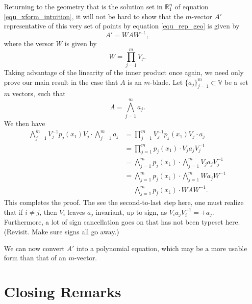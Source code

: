 \documentclass{ecgd-l}
\theoremstyle{definition}
\theoremstyle{remark}
\numberwithin{equation}{section}
\newcommand{\V}{\mathbb{V}}
\newcommand{\R}{\mathbb{R}}
\begin{document}
Returning to the geometry that is the solution set in $\R_1^n$
of equation \eqref{equ_xform_intuition},
it will not be hard to show that the $m$-vector $A'$ representative
of this very set of points by equation \eqref{equ_rep_geo} is given by
\begin{equation*}
A' = WAW^{-1},
\end{equation*}
where the versor $W$ is given by
\begin{equation*}
W = \prod_{j=1}^m V_j.
\end{equation*}
Taking advantage of the linearity of the inner product once again,
we need only prove our main result in the case that $A$ is an $m$-blade.
Let $\{a_j\}_{j=1}^m\subset \V$ be a set $m$ vectors, such that
\begin{equation*}
A = \bigwedge_{j=1}^m a_j.
\end{equation*}
We then have
\begin{align}
\bigwedge_{j=1}^m V_j^{-1}p_j(x_1)V_j\cdot\bigwedge_{j=1}^m a_j &=
\prod_{j=1}^m V_j^{-1}p_j(x_1)V_j\cdot a_j\nonumber \\
 &= \prod_{j=1}^m p_j(x_1)\cdot V_ja_jV_j^{-1}\nonumber \\
&= \bigwedge_{j=1}^m p_j(x_1)\cdot\bigwedge_{j=1}^m V_ja_jV_j^{-1}\nonumber \\
&= \bigwedge_{j=1}^m p_j(x_1)\cdot\bigwedge_{j=1}^m Wa_jW^{-1}\nonumber \\
&= \bigwedge_{j=1}^m p_j(x_1)\cdot WAW^{-1}.\nonumber
\end{align}
This completes the proof.  The see the second-to-last step here,
one must realize that if $i\neq j$, then $V_i$ leaves $a_j$ invariant, up to sign,
as $V_ia_jV_i^{-1}=\pm a_j$.  Furthermore, a lot of sign cancellation
goes on that has not been typeset here.  (Revisit.  Make sure signs all go away.)

We can now convert $A'$ into a polynomial equation, which
may be a more usable form than that of an $m$-vector.

\section{Closing Remarks}



\end{document}
